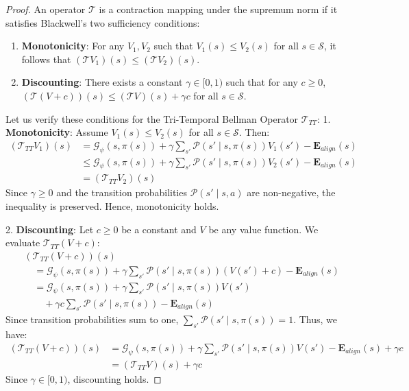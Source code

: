 \documentclass[manuscript, screen, review]{jair}
\begin{document}
\begin{proof}
An operator $\mathcal{T}$ is a contraction mapping under the supremum norm if it satisfies Blackwell's two sufficiency conditions:
\begin{enumerate}
    \item \textbf{Monotonicity}: For any $V_1, V_2$ such that $V_1(s) \le V_2(s)$ for all $s \in \mathcal{S}$, it follows that $(\mathcal{T} V_1)(s) \le (\mathcal{T} V_2)(s)$.
    \item \textbf{Discounting}: There exists a constant $\gamma \in [0, 1)$ such that for any $c \ge 0$, $(\mathcal{T} (V + c))(s) \le (\mathcal{T} V)(s) + \gamma c$ for all $s \in \mathcal{S}$.
\end{enumerate}

Let us verify these conditions for the Tri-Temporal Bellman Operator $\mathcal{T}_{TT}$:
1. \textbf{Monotonicity}: Assume $V_1(s) \le V_2(s)$ for all $s \in \mathcal{S}$. Then:
\begin{align*}
    (\mathcal{T}_{TT} V_1)(s) &= \mathcal{G}_\psi(s, \pi(s)) + \gamma \sum_{s'} \mathcal{P}(s' \mid s, \pi(s)) V_1(s') - \mathbf{E}_{align}(s) \\
    &\le \mathcal{G}_\psi(s, \pi(s)) + \gamma \sum_{s'} \mathcal{P}(s' \mid s, \pi(s)) V_2(s') - \mathbf{E}_{align}(s) \\
    &= (\mathcal{T}_{TT} V_2)(s)
\end{align*}
Since $\gamma \ge 0$ and the transition probabilities $\mathcal{P}(s' \mid s, a)$ are non-negative, the inequality is preserved. Hence, monotonicity holds.

2. \textbf{Discounting}: Let $c \ge 0$ be a constant and $V$ be any value function. We evaluate $\mathcal{T}_{TT} (V + c)$:
\begin{align*}
    &(\mathcal{T}_{TT} (V + c))(s) \\
    &\quad = \mathcal{G}_\psi(s, \pi(s)) + \gamma \sum_{s'} \mathcal{P}(s' \mid s, \pi(s)) (V(s') + c) - \mathbf{E}_{align}(s) \\
    &\quad = \mathcal{G}_\psi(s, \pi(s)) + \gamma \sum_{s'} \mathcal{P}(s' \mid s, \pi(s)) V(s') \\
    &\quad\quad + \gamma c \sum_{s'} \mathcal{P}(s' \mid s, \pi(s)) - \mathbf{E}_{align}(s)
\end{align*}
Since transition probabilities sum to one, $\sum_{s'} \mathcal{P}(s' \mid s, \pi(s)) = 1$. Thus, we have:
\begin{align*}
    (\mathcal{T}_{TT} (V + c))(s) &= \mathcal{G}_\psi(s, \pi(s)) + \gamma \sum_{s'} \mathcal{P}(s' \mid s, \pi(s)) V(s') - \mathbf{E}_{align}(s) + \gamma c \\
    &= (\mathcal{T}_{TT} V)(s) + \gamma c
\end{align*}
Since $\gamma \in [0, 1)$, discounting holds.


\end{proof}
\end{document}
